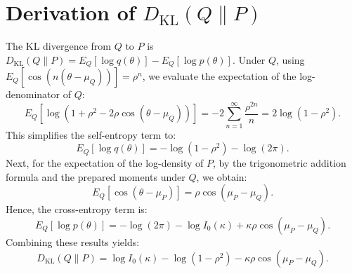\documentclass[11pt,a4paper]{article}
\begin{document}
\section{Derivation of $D_{\text{KL}}(Q \parallel P)$}
The KL divergence from $Q$ to $P$ is $D_{\text{KL}}(Q \parallel P) = E_Q[\log q(\theta)] - E_Q[\log p(\theta)]$. Under $Q$, using $E_Q[\cos(n(\theta - \mu_Q))] = \rho^n$, we evaluate the expectation of the log-denominator of $Q$:
\begin{equation}
E_Q[\log(1 + \rho^2 - 2\rho\cos(\theta - \mu_Q))] = -2 \sum_{n=1}^\infty \frac{\rho^{2n}}{n} = 2 \log(1 - \rho^2).
\end{equation}
This simplifies the self-entropy term to:
\begin{equation}
E_Q[\log q(\theta)] = -\log(1 - \rho^2) - \log(2\pi).
\end{equation}
Next, for the expectation of the log-density of $P$, by the trigonometric addition formula and the prepared moments under $Q$, we obtain:
\begin{equation}
E_Q[\cos(\theta - \mu_P)] = \rho \cos(\mu_P - \mu_Q).
\end{equation}
Hence, the cross-entropy term is:
\begin{equation}
E_Q[\log p(\theta)] = -\log(2\pi) - \log I_0(\kappa) + \kappa \rho \cos(\mu_P - \mu_Q).
\end{equation}
Combining these results yields:
\begin{equation}
D_{\text{KL}}(Q \parallel P) = \log I_0(\kappa) - \log(1 - \rho^2) - \kappa \rho \cos(\mu_P - \mu_Q).
\end{equation}
\end{document}
